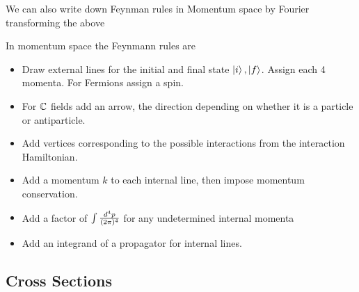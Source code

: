 \documentclass{article}
\begin{document}
We can also write down Feynman rules in Momentum space by Fourier transforming the above 

\begin{theorem}
In momentum space the Feynmann rules are 
\begin{itemize}
\item Draw external lines for the initial and final state $\ket{i}, \ket{f}$. Assign each 4 momenta. For Fermions assign a spin. 
    \item For $\mathbb{C}$ fields add an arrow, the direction depending on whether it is a particle or antiparticle. 
    \item Add vertices corresponding to the possible interactions from the interaction Hamiltonian. 
    \item Add a momentum $k$ to each internal line, then impose momentum conservation. 
    \item Add a factor of $\int \frac{d^4p}{(2\pi)^4}$ for any undetermined internal momenta 
    \item Add an integrand of a propagator for internal lines. 
\end{itemize}
\end{theorem}

\subsection{Cross Sections}

\end{document}
